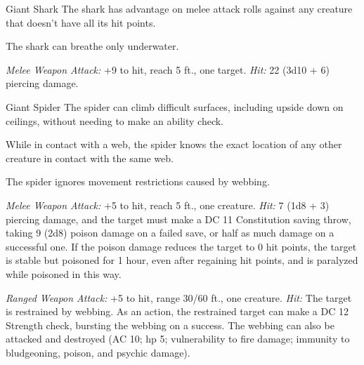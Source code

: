 \documentclass[10pt,a4paper,twoside,twocolumn,openany,nodeprecatedcode]{dndbook}
\begin{document}
\begin{DndMonster}[float=ht]{Giant Shark}
\DndMonsterBasics[
armor-class = {13 (natural armor)},
hit-points = {\DndDice{11d12 + 55}},
speed = {0 ft., 50 ft. (key)}
]
\DndMonsterAbilityScores[
 str = 23,
 dex = 11,
 con = 21,
 int = 1,
 wis = 10,
 cha = 5
]
\DndMonsterDetails[
skills = {Perception +3},
senses = {blindsight 60 ft., passive perception 13},
challenge = 5,
]
The shark has advantage on melee attack rolls against any creature that doesn't have all its hit points.

The shark can breathe only underwater.

\par
{}
\textsl{Melee Weapon Attack:} +9 to hit, reach 5 ft., one target. \textsl{Hit:} 22 (3d10 + 6) piercing damage.

\end{DndMonster}


\clearpage
{}

\begin{DndMonster}[float=ht]{Giant Spider}
\DndMonsterBasics[
armor-class = {14 (natural armor)},
hit-points = {\DndDice{4d10 + 4}},
speed = {30 ft., 30 ft. (key)}
]
\DndMonsterAbilityScores[
 str = 14,
 dex = 16,
 con = 12,
 int = 2,
 wis = 11,
 cha = 4
]
\DndMonsterDetails[
skills = {Stealth +7},
senses = {blindsight 10 ft., darkvision 60 ft., passive perception 10},
challenge = 1,
]
The spider can climb difficult surfaces, including upside down on ceilings, without needing to make an ability check.

While in contact with a web, the spider knows the exact location of any other creature in contact with the same web.

The spider ignores movement restrictions caused by webbing.

\par
{}
\textsl{Melee Weapon Attack:} +5 to hit, reach 5 ft., one creature. \textsl{Hit:} 7 (1d8 + 3) piercing damage, and the target must make a DC 11 Constitution saving throw, taking 9 (2d8) poison damage on a failed save, or half as much damage on a successful one. If the poison damage reduces the target to 0 hit points, the target is stable but poisoned for 1 hour, even after regaining hit points, and is paralyzed while poisoned in this way.

\textsl{Ranged Weapon Attack:} +5 to hit, range 30/60 ft., one creature. \textsl{Hit:} The target is restrained by webbing. As an action, the restrained target can make a DC 12 Strength check, bursting the webbing on a success. The webbing can also be attacked and destroyed (AC 10; hp 5; vulnerability to fire damage; immunity to bludgeoning, poison, and psychic damage).

\end{DndMonster}
\end{document}
